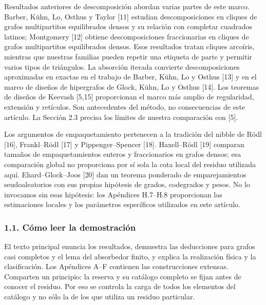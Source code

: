 \documentclass[spanish,11pt,a4paper]{article}
\begin{document}
Resultados anteriores de descomposición abordan varias partes de este marco. Barber, Kühn, Lo, Osthus y Taylor {[}11{]} estudian descomposiciones en cliques de grafos multipartitos equilibrados densos y su relación con completar cuadrados latinos; Montgomery {[}12{]} obtiene descomposiciones fraccionarias en cliques de grafos multipartitos equilibrados densos. Esos resultados tratan cliques arcoíris, mientras que nuestras familias pueden repetir una etiqueta de parte y permitir varios tipos de triángulos. La absorción iterada convierte descomposiciones aproximadas en exactas en el trabajo de Barber, Kühn, Lo y Osthus {[}13{]} y en el marco de diseños de hipergrafos de Glock, Kühn, Lo y Osthus {[}14{]}. Los teoremas de diseños de Keevash {[}5,15{]} proporcionan el marco más amplio de regularidad, extensión y retículos. Son antecedentes del método, no consecuencias de este artículo. La Sección 2.3 precisa los límites de nuestra comparación con {[}5{]}.

Los argumentos de empaquetamiento pertenecen a la tradición del nibble de Rödl {[}16{]}, Frankl--Rödl {[}17{]} y Pippenger--Spencer {[}18{]}. Haxell--Rödl {[}19{]} comparan tamaños de empaquetamientos enteros y fraccionarios en grafos densos; esa comparación global no proporciona por sí sola la cota local del residuo utilizada aquí. Ehard--Glock--Joos {[}20{]} dan un teorema ponderado de emparejamientos seudoaleatorios con sus propias hipótesis de grados, codegrados y pesos. No lo invocamos sin esas hipótesis: los Apéndices H.7--H.8 proporcionan las estimaciones locales y los parámetros específicos utilizados en este artículo.

\subsubsection{1.1. Cómo leer la demostración}\label{cuxf3mo-leer-la-demostraciuxf3n}

El texto principal enuncia los resultados, demuestra las deducciones para grafos casi completos y el lema del absorbedor finito, y explica la realización física y la clasificación. Los Apéndices A--F contienen las construcciones extensas. Comparten un principio: la reserva y su catálogo completo se fijan antes de conocer el residuo. Por eso se controla la carga de todos los elementos del catálogo y no sólo la de los que utiliza un residuo particular.
\end{document}
